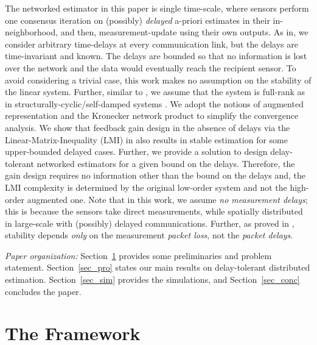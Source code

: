 \documentclass[journal]{IEEEtran}
\def\mb{\mathbf}
\begin{document}
The networked estimator in this paper is single time-scale, where sensors perform one consensus iteration on (possibly) \textit{delayed} a-priori estimates in their in-neighborhood, and then,  measurement-update using their own outputs.
As in\cite{Themis_delay}, we consider  arbitrary time-delays  at every communication link, but the delays are time-invariant and known. The delays are bounded so that no information is lost over the network and the data would eventually reach the recipient sensor.  
To avoid considering a trivial case, this work makes no assumption on the stability of the  linear system. Further, similar to \cite{sayed-kf,mohammadi2015distributed}, we assume that the system is full-rank as in structurally-cyclic/self-damped systems \cite{chapman2013strong,tnse_selfdamp}. We adopt the notions of augmented representation \cite{Themis_delay} and the Kronecker network product \cite{tsipn_kron} to simplify the convergence analysis. We show that feedback gain design in the absence of delays via the Linear-Matrix-Inequality (LMI) in \cite{jstsp,usman_cdc:11} also results in  stable  estimation  for  some upper-bounded delayed cases. Further, we provide a solution to design delay-tolerant networked estimators for a given bound on the delays. Therefore, the gain design requires no information other than the bound  on the delays and, the LMI complexity is determined by the original low-order system and not the high-order augmented one. Note that in this work, we assume \textit{no measurement delays}; this is because the sensors take direct measurements, while spatially distributed in large-scale with (possibly) delayed communications. Further, as proved in \cite{schenato2006optimal}, stability  depends \textit{only} on the measurement \textit{packet loss}, not the \textit{packet delays}.

\textit{Paper organization:} Section~\ref{sec_fram} provides some preliminaries and problem statement. Section~\ref{sec_pro} states our main results on delay-tolerant distributed estimation. Section~\ref{sec_sim} provides the simulations, and Section~\ref{sec_conc} concludes the paper.


\section{The Framework} \label{sec_fram}
\end{document}
